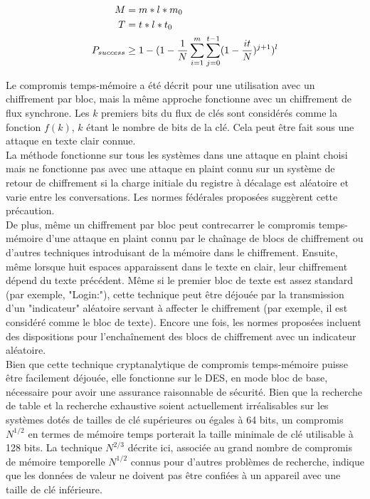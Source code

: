 	\begin{align*}
		M &= m*l*m_0\\
		T &= t*l*t_0\\
		P_{success} &\ge{} 1 - (1 - \frac{1}{N} \sum\limits_{i=1}^{m}\sum\limits_{j=0}^{t-1} (1 - \frac{it}{N})^{j+1})^l
	\end{align*}

	Le compromis temps-mémoire a été décrit pour une utilisation avec un chiffrement par bloc\cite{ehellman}, mais la même approche fonctionne avec un chiffrement de flux synchrone\cite{ehellman}. Les $k$ premiers bits du flux de clés sont considérés comme la fonction $f(k)$, $k$ étant le nombre de bits de la clé. Cela peut être fait sous une attaque en texte clair connue.\\

	La méthode fonctionne sur tous les systèmes dans une attaque en \gls{plaint} choisi mais ne fonctionne pas avec une attaque en \gls{plaint} connu sur un système de retour de chiffrement si la charge initiale du registre à décalage est aléatoire et varie entre les conversations. Les normes fédérales proposées\cite{ehellman} suggèrent cette précaution.\\

	De plus, même un chiffrement par bloc peut contrecarrer le compromis temps-mémoire d'une attaque en \gls{plaint} connu par le chaînage de blocs de chiffrement ou d'autres techniques introduisant de la mémoire dans le chiffrement. Ensuite, même lorsque huit espaces apparaissent dans le texte en clair, leur chiffrement dépend du texte précédent. Même si le premier bloc de texte est assez standard (par exemple, "Login:"), cette technique peut être déjouée par la transmission d'un "indicateur" aléatoire servant à affecter le chiffrement (par exemple, il est considéré comme le bloc de texte). Encore une fois, les normes proposées\cite{ehellman} incluent des dispositions pour l'enchaînement des blocs de chiffrement avec un indicateur aléatoire.\\

	Bien que cette technique cryptanalytique de compromis temps-mémoire puisse être facilement déjouée, elle fonctionne sur le DES, en mode bloc de base, nécessaire pour avoir une assurance raisonnable de sécurité. Bien que la recherche de table et la recherche exhaustive soient actuellement irréalisables sur les systèmes dotés de tailles de clé supérieures ou égales à 64 bits, un compromis $N^{1/2}$ en termes de mémoire temps porterait la taille minimale de clé utilisable à 128 bits. La technique $N^{2/3}$ décrite ici, associée au grand nombre de compromis de mémoire temporelle $N^{1/2}$ connus pour d’autres problèmes de recherche, indique que les données de valeur ne doivent pas être confiées à un appareil avec une taille de clé inférieure.

	\clearpage

\endinput{}

